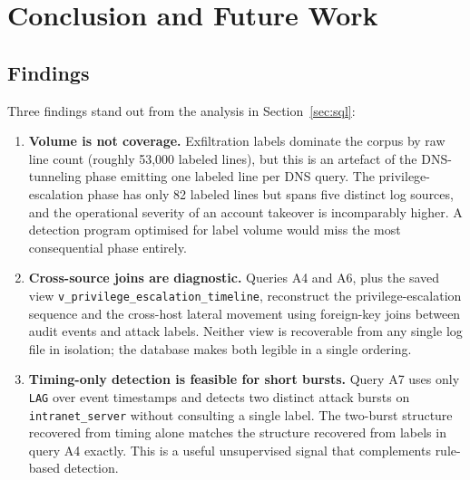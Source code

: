 \section{Conclusion and Future Work}
\label{sec:conclusion}

\subsection{Findings}
Three findings stand out from the analysis in
Section~\ref{sec:sql}:
\begin{enumerate}
  \item \textbf{Volume is not coverage.} Exfiltration labels dominate
    the corpus by raw line count (roughly 53{,}000 labeled lines),
    but this is an artefact of the DNS-tunneling phase emitting one
    labeled line per DNS query. The privilege-escalation phase has
    only 82 labeled lines but spans five distinct log sources, and
    the operational severity of an account takeover is incomparably
    higher. A detection program optimised for label volume would
    miss the most consequential phase entirely.
  \item \textbf{Cross-source joins are diagnostic.} Queries A4 and
    A6, plus the saved view
    \texttt{v\_privilege\_escalation\_timeline}, reconstruct the
    privilege-escalation sequence and the cross-host lateral movement
    using foreign-key joins between audit events and attack labels.
    Neither view is recoverable from any single log file in
    isolation; the database makes both legible in a single ordering.
  \item \textbf{Timing-only detection is feasible for short bursts.}
    Query A7 uses only \texttt{LAG} over event timestamps and detects
    two distinct attack bursts on \texttt{intranet\_server} without
    consulting a single label. The two-burst structure recovered from
    timing alone matches the structure recovered from labels in
    query A4 exactly. This is a useful unsupervised signal that
    complements rule-based detection.
\end{enumerate}

